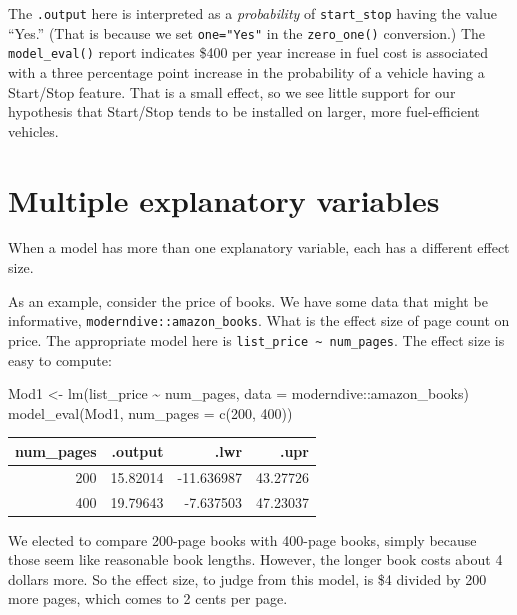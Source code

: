 \documentclass[
  letterpaper,
  DIV=11,
  numbers=noendperiod,
  oneside]{scrreprt}
\newenvironment{Shaded}{\begin{snugshade}}{\end{snugshade}}
\newcommand{\AttributeTok}[1]{\textcolor[rgb]{0.40,0.45,0.13}{#1}}
\newcommand{\DecValTok}[1]{\textcolor[rgb]{0.68,0.00,0.00}{#1}}
\newcommand{\FunctionTok}[1]{\textcolor[rgb]{0.28,0.35,0.67}{#1}}
\newcommand{\NormalTok}[1]{\textcolor[rgb]{0.00,0.23,0.31}{#1}}
\newcommand{\OtherTok}[1]{\textcolor[rgb]{0.00,0.23,0.31}{#1}}
\newcommand{\SpecialCharTok}[1]{\textcolor[rgb]{0.37,0.37,0.37}{#1}}
\begin{document}
\begin{tcolorbox}
The \texttt{.output} here is interpreted as a \emph{probability} of
\texttt{start\_stop} having the value ``Yes.'' (That is because we set
\texttt{one="Yes"} in the \texttt{zero\_one()} conversion.) The
\texttt{model\_eval()} report indicates \$400 per year increase in fuel
cost is associated with a three percentage point increase in the
probability of a vehicle having a Start/Stop feature. That is a small
effect, so we see little support for our hypothesis that Start/Stop
tends to be installed on larger, more fuel-efficient vehicles.

\end{tcolorbox}

\hypertarget{multiple-explanatory-variables}{%
\section{Multiple explanatory
variables}\label{multiple-explanatory-variables}}

When a model has more than one explanatory variable, each has a
different effect size.

As an example, consider the price of books. We have some data that might
be informative, \texttt{moderndive::amazon\_books}. What is the effect
size of page count on price. The appropriate model here is
\texttt{list\_price\ \textasciitilde{}\ num\_pages}. The effect size is
easy to compute:

\begin{Shaded}
\begin{Highlighting}[]
\NormalTok{Mod1 }\OtherTok{\textless{}{-}} \FunctionTok{lm}\NormalTok{(list\_price }\SpecialCharTok{\textasciitilde{}}\NormalTok{ num\_pages, }\AttributeTok{data =}\NormalTok{ moderndive}\SpecialCharTok{::}\NormalTok{amazon\_books)}
\FunctionTok{model\_eval}\NormalTok{(Mod1, }\AttributeTok{num\_pages =} \FunctionTok{c}\NormalTok{(}\DecValTok{200}\NormalTok{, }\DecValTok{400}\NormalTok{))}
\end{Highlighting}
\end{Shaded}

\ttfamily 
\begin{tabular}{rrrr}
\toprule
num\_pages & .output & .lwr & .upr\\
\midrule
200 & 15.82014 & -11.636987 & 43.27726\\
400 & 19.79643 & -7.637503 & 47.23037\\
\bottomrule
\end{tabular} \normalfont
\bigskip

We elected to compare 200-page books with 400-page books, simply because
those seem like reasonable book lengths. However, the longer book costs
about 4 dollars more. So the effect size, to judge from this model, is
\$4 divided by 200 more pages, which comes to 2 cents per page.
\end{document}
